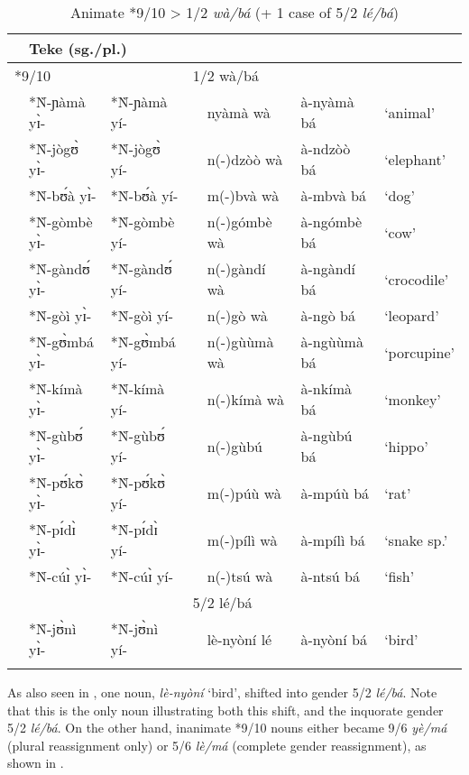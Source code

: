 \documentclass[output=paper,,modfonts,nonflat]{langsci/langscibook}
\begin{document}
\begin{table}[!htbp]
\caption{Animate *9/10 > 1/2 \textit{wà/bá} (+ 1 case of 5/2 \textit{lé/bá})}
\label{table11}
\begin{small}
\begin{tabular}{l		l l l  		l		l		l}
\lsptoprule														
\multicolumn{3}{l}{PB (sg./pl.)}					&	\multicolumn{2}{l}{Teke (sg./pl.)}					&		\\	
\midrule														
\multicolumn{2}{l}{*9/10}			&		&	\multicolumn{2}{l}{1/2 wà/bá}			&		&		\\	
	&	*Ǹ-ɲàmà yɪ̀-	&	*Ǹ-ɲàmà yí-	&		&	nyàmà wà	&	à-nyàmà bá	&	`animal’	\\	
	&	*Ǹ-jògʊ̀ yɪ̀-	&	*Ǹ-jògʊ̀ yí-	&		&	n(-)dzòò wà	&	à-ndzòò bá	&	`elephant’	\\	
	&	*Ǹ-bʊ́à yɪ̀-	&	*Ǹ-bʊ́à yí-	&		&	m(-)bvà wà	&	à-mbvà bá	&	`dog’	\\	
	&	*Ǹ-gòmbè yɪ̀-	&	*Ǹ-gòmbè yí-	&		&	n(-)gómbè wà	&	à-ngómbè bá	&	`cow’	\\	
	&	*Ǹ-gàndʊ́ yɪ̀-	&	*Ǹ-gàndʊ́ yí-	&		&	n(-)gàndí wà	&	à-ngàndí bá	&	`crocodile’	\\	
	&	*Ǹ-gòì yɪ̀-	&	*Ǹ-gòì yí-	&		&	n(-)gò wà	&	à-ngò bá	&	`leopard’	\\	
	&	*Ǹ-gʊ̀mbá yɪ̀-	&	*Ǹ-gʊ̀mbá yí-	&		&	n(-)gùùmà wà	&	à-ngùùmà bá	&	`porcupine’	\\	
	&	*Ǹ-kímà yɪ̀-	&	*Ǹ-kímà yí-	&		&	n(-)kímà wà	&	à-nkímà bá	&	`monkey’	\\	
	&	*Ǹ-gùbʊ́ yɪ̀-	&	*Ǹ-gùbʊ́ yí-	&		&	n(-)gùbú	&	à-ngùbú bá	&	`hippo’	\\	
	&	*Ǹ-pʊ́kʊ̀ yɪ̀-	&	*Ǹ-pʊ́kʊ̀ yí-	&		&	m(-)púù wà	&	à-mpúù bá	&	`rat’	\\	
	&	*Ǹ-pɪ́dɪ̀ yɪ̀-	&	*Ǹ-pɪ́dɪ̀ yí-	&		&	m(-)pílì wà	&	à-mpílì bá	&	`snake sp.’	\\	
	&	*Ǹ-cúɪ̀ yɪ̀-	&	*Ǹ-cúɪ̀ yí-	&		&	n(-)tsú wà	&	à-ntsú bá	&	`fish’	\\	[0.2cm]
	&		&		&	\multicolumn{2}{l}{5/2 lé/bá}			&		&		\\	
	&	*Ǹ-jʊ̀nì yɪ̀-	&	*Ǹ-jʊ̀nì yí-	&		&	lè-nyòní lé	&	à-nyòní bá	&	`bird’	\\	
\lspbottomrule
\end{tabular}
\end{small}	
\end{table}

As also seen in , one noun, \textit{lè-nyòní} `bird’, shifted into gender 5/2 \textit{lé/bá}. Note that this is the only noun illustrating both this shift, and the inquorate gender 5/2 \textit{lé/bá}. On the other hand, inanimate *9/10 nouns either became 9/6 \textit{yè/má} (plural reassignment only) or 5/6 \textit{lè/má} (complete gender reassignment), as shown in .
\end{document}

